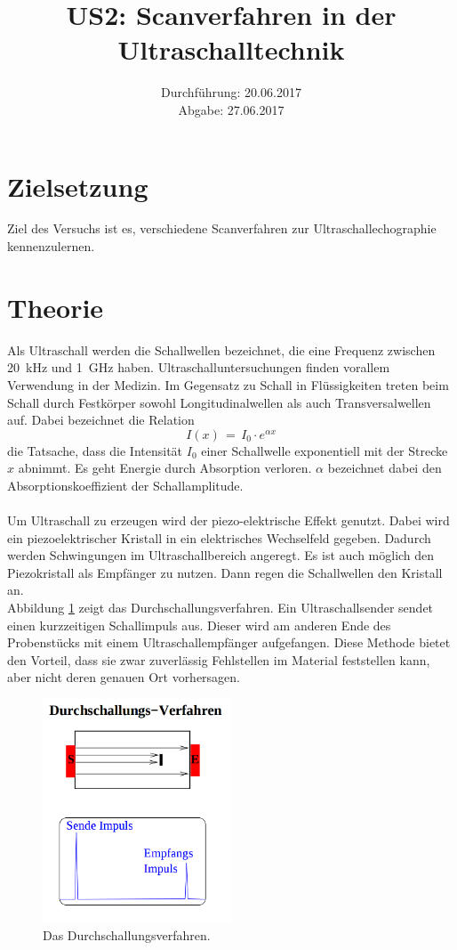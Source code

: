 \documentclass[
  bibliography=totoc,     %
  captions=tableheading,  %
  titlepage=firstiscover, %
]{scrartcl}
\title{US2: Scanverfahren in der Ultraschalltechnik}
\author{
  Simon Schulte
  \texorpdfstring{
    \\
    \href{mailto:simon.schulte@udo.edu}{simon.schulte@udo.edu}
  }{}
  \texorpdfstring{\and}{, }
  Tim Sedlaczek
  \texorpdfstring{
    \\
    \href{mailto:tim.sedlaczek@udo.edu}{tim.sedlaczek@udo.edu}
  }{}
}
\date{Durchführung: 20.06.2017\\
      Abgabe: 27.06.2017}
\begin{document}
\maketitle
\thispagestyle{empty}
\tableofcontents
\newpage
\setcounter{page}{1}
\section{Zielsetzung}
\label{sec:zielsetzung}
Ziel des Versuchs ist es, verschiedene Scanverfahren zur
Ultraschallechographie kennenzulernen.
\section{Theorie}
\label{sec:theorie}
Als Ultraschall werden die Schallwellen bezeichnet, die eine Frequenz zwischen
\SI{20}{\kilo\hertz} und \SI{1}{\giga\hertz} haben. Ultraschalluntersuchungen
finden vorallem Verwendung in der Medizin.
Im Gegensatz zu Schall in Flüssigkeiten treten beim Schall durch Festkörper sowohl
Longitudinalwellen als auch Transversalwellen auf. Dabei bezeichnet die Relation
\begin{equation}
  I(x)\,=\,I_0 \cdot e^{\alpha x}
  \label{eqn:intensität}
\end{equation}
die Tatsache, dass die Intensität $I_0$ einer Schallwelle exponentiell mit der
Strecke $x$ abnimmt. Es geht Energie durch Absorption verloren. $\alpha$
bezeichnet dabei den Absorptionskoeffizient der Schallamplitude. \\
\\
Um Ultraschall zu erzeugen wird der piezo-elektrische Effekt genutzt. Dabei
wird ein piezoelektrischer Kristall in ein elektrisches Wechselfeld gegeben.
Dadurch werden Schwingungen im Ultraschallbereich angeregt. Es ist auch möglich
den Piezokristall als Empfänger zu nutzen. Dann regen die Schallwellen den
Kristall an. \\
\clearpage
\noindent
Abbildung \ref{fig:US22} zeigt das Durchschallungsverfahren. Ein
Ultraschallsender sendet einen kurzzeitigen Schallimpuls aus. Dieser wird am
anderen Ende des Probenstücks mit einem Ultraschallempfänger aufgefangen. Diese
Methode bietet den Vorteil, dass sie zwar zuverlässig Fehlstellen im Material
feststellen kann, aber nicht deren genauen Ort vorhersagen.
\begin{figure}[H]
  \centering
  \includegraphics[width=0.5\textwidth]{US22.png}
  \caption{Das Durchschallungsverfahren. \cite{anleitung}}
  \label{fig:US22}
\end{figure}
\end{document}
